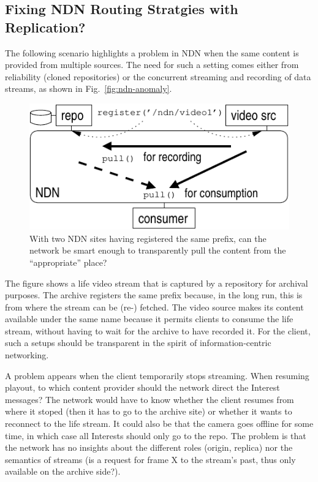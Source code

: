 \documentclass[sigconf]{acmart}
\begin{document}
\subsection{Fixing NDN Routing Stratgies with Replication?}

The following scenario highlights a problem in NDN when the same
content is provided from multiple sources. The need for such a setting
comes either from reliability (cloned repositories) or the concurrent
streaming and recording of data streams, as shown in
Fig.~\ref{fig:ndn-anomaly}.

\begin{figure}[htb]
  \raggedright
  \includegraphics[width=0.9\columnwidth]{figs/ndn-anomaly.pdf}
  \caption{\label{fig:ssb-and-ndn}With two NDN sites having registered
    the same prefix, can the network be smart enough to transparently
    pull the content from the ``appropriate'' place?}
\end{figure}

The figure shows a life video stream that is captured by a repository
for archival purposes. The archive registers the same prefix because,
in the long run, this is from where the stream can be (re-)
fetched. The video source makes its content available under the same
name because it permits clients to consume the life stream, without
having to wait for the archive to have recorded it. For the client,
such a setups should be transparent in the spirit of
information-centric networking.

A problem appears when the client temporarily stops streaming. When
resuming playout, to which content provider should the network direct
the Interest messages? The network would have to know whether the
client resumes from where it stoped (then it has to go to the archive
site) or whether it wants to reconnect to the life stream. It could
also be that the camera goes offline for some time, in which case all
Interests should only go to the repo. The problem is that the network
has no insights about the different roles (origin, replica) nor the
semantics of streams (is a request for frame X to the stream's past,
thus only available on the archive side?).
\end{document}
